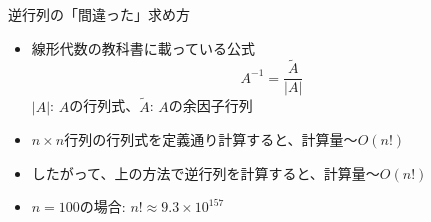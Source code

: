 \begin{frame}[t,fragile]{逆行列の「間違った」求め方}
  \begin{itemize}
    \setlength{\itemsep}{1em}
  \item 線形代数の教科書に載っている公式
    \[
    A^{-1} = \frac{\tilde{A}}{|A|}
    \]
    $|A|$: $A$の行列式、$\tilde{A}$: $A$の余因子行列
  \item $n \times n$行列の行列式を定義通り計算すると、計算量〜$O(n!)$
  \item したがって、上の方法で逆行列を計算すると、計算量〜$O(n!)$
  \item $n=100$の場合: $n! \approx 9.3 \times 10^{157}$
  \end{itemize}
\end{frame}
